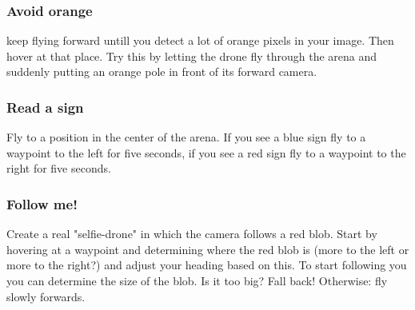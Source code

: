 \documentclass{article}
\begin{document}
\subsubsection*{Avoid orange}
 keep flying forward untill you detect a lot of orange pixels in your image. Then hover at that place. 
Try this by letting the drone fly through the arena and suddenly putting an orange pole in front of its forward camera.

\subsubsection*{Read a sign}
Fly to a position in the center of the arena. If you see a blue sign fly to a waypoint to the left for five seconds, if you see a red sign fly to a waypoint to the right for five seconds. 

\subsubsection*{Follow me!}
Create a real "selfie-drone" in which the camera follows a red blob. 
Start by hovering at a waypoint and determining where the red blob is (more to the left or more to the right?) and adjust your heading based on this. 
To start following you you can determine the size of the blob. Is it too big? Fall back! Otherwise: fly slowly forwards.
\end{document}
